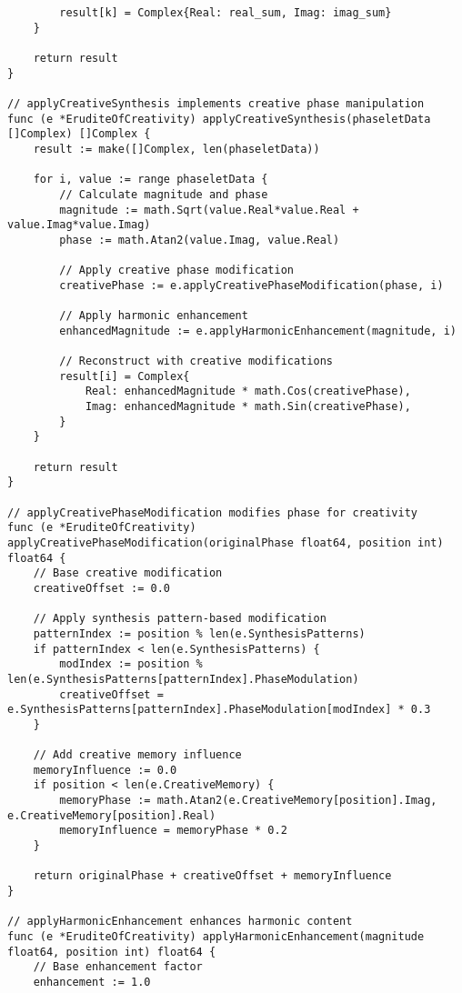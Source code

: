\begin{tcolorbox}[colback=CodeBackground, colframe=DarkGray, title=Erudite of Creativity Implementation, fonttitle=\bfseries]
\begin{verbatim}
        result[k] = Complex{Real: real_sum, Imag: imag_sum}
    }
    
    return result
}

// applyCreativeSynthesis implements creative phase manipulation
func (e *EruditeOfCreativity) applyCreativeSynthesis(phaseletData []Complex) []Complex {
    result := make([]Complex, len(phaseletData))
    
    for i, value := range phaseletData {
        // Calculate magnitude and phase
        magnitude := math.Sqrt(value.Real*value.Real + value.Imag*value.Imag)
        phase := math.Atan2(value.Imag, value.Real)
        
        // Apply creative phase modification
        creativePhase := e.applyCreativePhaseModification(phase, i)
        
        // Apply harmonic enhancement
        enhancedMagnitude := e.applyHarmonicEnhancement(magnitude, i)
        
        // Reconstruct with creative modifications
        result[i] = Complex{
            Real: enhancedMagnitude * math.Cos(creativePhase),
            Imag: enhancedMagnitude * math.Sin(creativePhase),
        }
    }
    
    return result
}

// applyCreativePhaseModification modifies phase for creativity
func (e *EruditeOfCreativity) applyCreativePhaseModification(originalPhase float64, position int) float64 {
    // Base creative modification
    creativeOffset := 0.0
    
    // Apply synthesis pattern-based modification
    patternIndex := position % len(e.SynthesisPatterns)
    if patternIndex < len(e.SynthesisPatterns) {
        modIndex := position % len(e.SynthesisPatterns[patternIndex].PhaseModulation)
        creativeOffset = e.SynthesisPatterns[patternIndex].PhaseModulation[modIndex] * 0.3
    }
    
    // Add creative memory influence
    memoryInfluence := 0.0
    if position < len(e.CreativeMemory) {
        memoryPhase := math.Atan2(e.CreativeMemory[position].Imag, e.CreativeMemory[position].Real)
        memoryInfluence = memoryPhase * 0.2
    }
    
    return originalPhase + creativeOffset + memoryInfluence
}

// applyHarmonicEnhancement enhances harmonic content
func (e *EruditeOfCreativity) applyHarmonicEnhancement(magnitude float64, position int) float64 {
    // Base enhancement factor
    enhancement := 1.0
    

\end{verbatim}
\end{tcolorbox}

